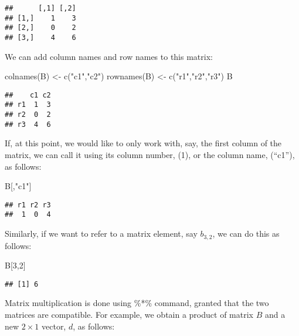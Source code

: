 \documentclass[
  oneside]{book}
\newenvironment{Shaded}{\begin{snugshade}}{\end{snugshade}}
\newcommand{\DecValTok}[1]{\textcolor[rgb]{0.00,0.00,0.81}{#1}}
\newcommand{\FunctionTok}[1]{\textcolor[rgb]{0.00,0.00,0.00}{#1}}
\newcommand{\NormalTok}[1]{#1}
\newcommand{\OtherTok}[1]{\textcolor[rgb]{0.56,0.35,0.01}{#1}}
\newcommand{\StringTok}[1]{\textcolor[rgb]{0.31,0.60,0.02}{#1}}
\begin{document}
\begin{verbatim}
##      [,1] [,2]
## [1,]    1    3
## [2,]    0    2
## [3,]    4    6
\end{verbatim}

We can add column names and row names to this matrix:

\begin{Shaded}
\begin{Highlighting}[]
\FunctionTok{colnames}\NormalTok{(B) }\OtherTok{\textless{}{-}} \FunctionTok{c}\NormalTok{(}\StringTok{"c1"}\NormalTok{,}\StringTok{"c2"}\NormalTok{)}
\FunctionTok{rownames}\NormalTok{(B) }\OtherTok{\textless{}{-}} \FunctionTok{c}\NormalTok{(}\StringTok{"r1"}\NormalTok{,}\StringTok{"r2"}\NormalTok{,}\StringTok{"r3"}\NormalTok{)}
\NormalTok{B}
\end{Highlighting}
\end{Shaded}

\begin{verbatim}
##    c1 c2
## r1  1  3
## r2  0  2
## r3  4  6
\end{verbatim}

If, at this point, we would like to only work with, say, the first column of the matrix, we can call it using its column number, (1), or the column name, (``c1''), as follows:

\begin{Shaded}
\begin{Highlighting}[]
\NormalTok{B[,}\StringTok{"c1"}\NormalTok{]}
\end{Highlighting}
\end{Shaded}

\begin{verbatim}
## r1 r2 r3 
##  1  0  4
\end{verbatim}

Similarly, if we want to refer to a matrix element, say \(b_{3,2}\), we can do this as follows:

\begin{Shaded}
\begin{Highlighting}[]
\NormalTok{B[}\DecValTok{3}\NormalTok{,}\DecValTok{2}\NormalTok{]}
\end{Highlighting}
\end{Shaded}

\begin{verbatim}
## [1] 6
\end{verbatim}

Matrix multiplication is done using \%*\% command, granted that the two matrices are compatible. For example, we obtain a product of matrix \(B\) and a new \(2 \times 1\) vector, \(d\), as follows:
\end{document}
